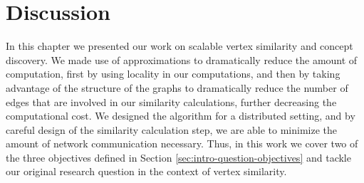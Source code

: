 \section{Discussion}

In this chapter we presented our work on scalable vertex similarity and concept
discovery. We made use of approximations to dramatically reduce the amount of
computation, first by using locality in our computations, and then by taking
advantage of the structure of the graphs to dramatically reduce the number of
edges that are involved in our similarity calculations, further decreasing the
computational cost. We designed the algorithm for a distributed setting, and
by careful design of the similarity calculation step, we are able to minimize
the amount of network communication necessary. Thus, in this work we cover
two of the three objectives defined in Section \ref{sec:intro-question-objectives}
and tackle our original research question in the context of vertex similarity.